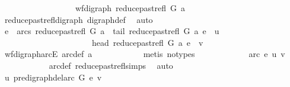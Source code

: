 \begin{isabellebody}
\ \ \ \ \ \ \isamarkupfalse%
\ {\isacharminus}{\kern0pt}\isanewline
\ \ \ \ \ \ \ \ \isamarkupfalse%
\ {\isachardoublequoteopen}wf{\isacharunderscore}{\kern0pt}digraph\ {\isacharparenleft}{\kern0pt}reduce{\isacharunderscore}{\kern0pt}past{\isacharunderscore}{\kern0pt}refl\ G\ a{\isacharparenright}{\kern0pt}{\isachardoublequoteclose}\isanewline
\ \ \ \ \ \ \ \ \ \ \isamarkupfalse%
\ reduce{\isacharunderscore}{\kern0pt}past{\isacharunderscore}{\kern0pt}refl{\isacharunderscore}{\kern0pt}digraph\ digraph{\isacharunderscore}{\kern0pt}def\ \isamarkupfalse%
\ auto\isanewline
\ \ \ \ \ \ \ \ \isamarkupfalse%
\ \isamarkupfalse%
\ {\isachardoublequoteopen}e\ {\isasymin}\ arcs\ {\isacharparenleft}{\kern0pt}reduce{\isacharunderscore}{\kern0pt}past{\isacharunderscore}{\kern0pt}refl\ G\ a{\isacharparenright}{\kern0pt}\ {\isasymand}\ tail\ {\isacharparenleft}{\kern0pt}reduce{\isacharunderscore}{\kern0pt}past{\isacharunderscore}{\kern0pt}refl\ G\ a{\isacharparenright}{\kern0pt}\ e\ {\isacharequal}{\kern0pt}\ u\isanewline
\ \ \ \ \ \ \ \ \ \ \ \ \ \ \ \ \ \ \ \ \ {\isasymand}\ head\ {\isacharparenleft}{\kern0pt}reduce{\isacharunderscore}{\kern0pt}past{\isacharunderscore}{\kern0pt}refl\ G\ a{\isacharparenright}{\kern0pt}\ e\ {\isacharequal}{\kern0pt}\ v{\isachardoublequoteclose}\isanewline
\ \ \ \ \ \ \ \ \ \ \isamarkupfalse%
\ wf{\isacharunderscore}{\kern0pt}digraph{\isachardot}{\kern0pt}arcE\ arc{\isacharunderscore}{\kern0pt}def\ a\isanewline
\ \ \ \ \ \ \ \ \ \ \isamarkupfalse%
\ {\isacharparenleft}{\kern0pt}metis\ {\isacharparenleft}{\kern0pt}no{\isacharunderscore}{\kern0pt}types{\isacharparenright}{\kern0pt}{\isacharparenright}{\kern0pt}\ \isanewline
\ \ \ \ \ \ \ \ \isamarkupfalse%
\ \isamarkupfalse%
\ {\isachardoublequoteopen}arc\ e\ {\isacharparenleft}{\kern0pt}u{\isacharcomma}{\kern0pt}\ v{\isacharparenright}{\kern0pt}{\isachardoublequoteclose}\isanewline
\ \ \ \ \ \ \ \ \ \ \isamarkupfalse%
\ arc{\isacharunderscore}{\kern0pt}def\ reduce{\isacharunderscore}{\kern0pt}past{\isacharunderscore}{\kern0pt}refl{\isachardot}{\kern0pt}simps\ \isamarkupfalse%
\ auto\isanewline
\ \ \ \ \ \ \isamarkupfalse%
\isanewline
\ \ \ \ \ \ \isamarkupfalse%
\ {\isachardoublequoteopen}u\ {\isasymrightarrow}\isactrlsup {\isacharplus}{\kern0pt}\isactrlbsub pre{\isacharunderscore}{\kern0pt}digraph{\isachardot}{\kern0pt}del{\isacharunderscore}{\kern0pt}arc\ G\ e\isactrlesub \ v{\isachardoublequoteclose}\isanewline

\end{isabellebody}
